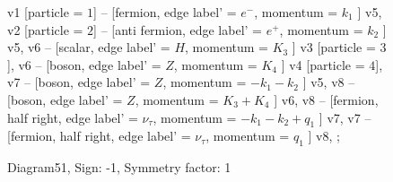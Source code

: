 \documentclass{revtex4}
\begin{document}
\begin{figure}[!htb]
\begin{center}
{    %
v1 [particle = \(1\)] -- [fermion, edge label' = \(e^{-}\), momentum = \(k_{1}\) ] v5, 
v2 [particle = \(2\)] -- [anti fermion, edge label' = \(e^{+}\), momentum = \(k_{2}\) ] v5, 
v6 -- [scalar, edge label' = \(H\), momentum = \(K_{3}\) ] v3 [particle = \(3\)], 
v6 -- [boson, edge label' = \(Z\), momentum = \(K_{4}\) ] v4 [particle = \(4\)], 
v7 -- [boson, edge label' = \(Z\), momentum = \(-k_{1} - k_{2}\) ] v5, 
v8 -- [boson, edge label' = \(Z\), momentum = \(K_{3} + K_{4}\) ] v6, 
v8 -- [fermion, half right, edge label' = \(\nu_{\tau}\), momentum = \(-k_{1} - k_{2} + q_{1}\) ] v7, 
v7 -- [fermion, half right, edge label' = \(\nu_{\tau}\), momentum = \(q_{1}\) ] v8, 
};
\end{center}
\caption{Diagram51, Sign: -1, Symmetry factor: 1}
\end{figure}
\newpage
\end{document}
